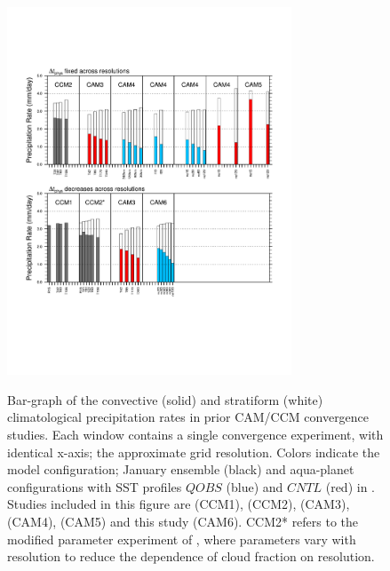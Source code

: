 \documentclass[alpha-refs]{wiley-article}
\begin{document}
\begin{figure}[t]
\begin{center}
\noindent\includegraphics[width=20pc,angle=0]{figs/cam-history.pdf}\\
\end{center}
\caption{Bar-graph of the convective (solid) and stratiform (white) climatological precipitation rates in prior CAM/CCM convergence studies. Each window contains a single convergence experiment, with identical x-axis; the approximate grid resolution. Colors indicate the model configuration; January ensemble (black) and aqua-planet configurations with SST profiles $QOBS$ (blue) and $CNTL$ (red) in \cite{NH2000ASL}. Studies included in this figure are \cite{KW1991JGR} (CCM1), \cite{WETAL1995CD} (CCM2), \cite{W2008TELLUS} (CAM3), \cite{RETAL2013JCLIM,ZetAl2014JCb,HR2017JCLIM} (CAM4), \cite{ZetAl2014JCb} (CAM5) and this study (CAM6). CCM2* refers to the modified parameter experiment of \cite{WETAL1995CD}, where parameters vary with resolution to reduce the dependence of cloud fraction on resolution.}
\label{fig:cam-history}
\end{figure}
\end{document}
